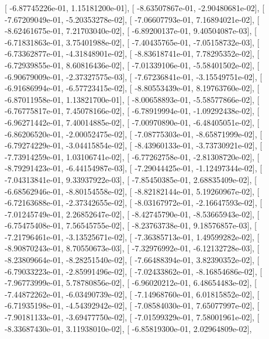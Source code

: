 \documentclass{article}
\begin{document}
       [ -6.87745226e-01,   1.15181200e-01],
       [ -8.63507867e-01,  -2.90480681e-02],
       [ -7.67209049e-01,  -5.20353278e-02],
       [ -7.06607793e-01,   7.16894021e-02],
       [ -8.62461675e-01,   7.21703040e-02],
       [ -6.89200137e-01,   9.40504087e-03],
       [ -6.71831863e-01,   3.75401988e-02],
       [ -7.40435765e-01,  -7.05158732e-03],
       [ -6.73362877e-01,  -4.31848901e-02],
       [ -8.83618741e-01,   7.78295352e-02],
       [ -6.72939855e-01,   8.60816436e-02],
       [ -7.01339106e-01,  -5.58401502e-02],
       [ -6.90679009e-01,  -2.37327575e-03],
       [ -7.67236841e-01,  -3.15549751e-02],
       [ -6.91686994e-01,  -6.57723415e-02],
       [ -8.80553439e-01,   8.19763760e-02],
       [ -6.87011958e-01,   1.13821700e-01],
       [ -8.00658893e-01,  -5.58577866e-02],
       [ -6.76775817e-01,   7.45078166e-02],
       [ -6.78919994e-01,  -1.09292438e-02],
       [ -6.96271442e-01,   7.40014885e-02],
       [ -7.00970890e-01,  -6.48405051e-02],
       [ -6.86206520e-01,  -2.00052475e-02],
       [ -7.08775303e-01,  -8.65871999e-02],
       [ -6.79274229e-01,  -3.04415854e-02],
       [ -8.43960133e-01,  -3.73730921e-02],
       [ -7.73914259e-01,   1.03106741e-02],
       [ -6.77262758e-01,  -2.81308720e-02],
       [ -8.79291423e-01,  -6.44154987e-03],
       [ -7.29044425e-01,  -1.12497344e-02],
       [ -7.04313841e-01,   9.33937922e-03],
       [ -7.85450385e-01,   2.68835409e-02],
       [ -6.68562946e-01,  -8.80154558e-02],
       [ -8.82182144e-01,   5.19260967e-02],
       [ -6.72163688e-01,  -2.37342655e-02],
       [ -8.03167972e-01,  -2.16647593e-02],
       [ -7.01245749e-01,   2.26852647e-02],
       [ -8.42745790e-01,  -8.53665943e-02],
       [ -6.75475408e-01,   7.56545755e-02],
       [ -8.23763738e-01,   9.18576857e-03],
       [ -7.21796461e-01,  -3.13525671e-02],
       [ -7.36385713e-01,   1.49599282e-02],
       [ -8.90870243e-01,   8.70550673e-03],
       [ -7.32976992e-01,  -6.12132728e-03],
       [ -8.23809664e-01,  -8.28251540e-02],
       [ -7.66488394e-01,   3.82390352e-02],
       [ -6.79033223e-01,  -2.85991496e-02],
       [ -7.02433862e-01,  -8.16854686e-02],
       [ -7.96773999e-01,   5.78780856e-02],
       [ -6.96020212e-01,   6.48654483e-02],
       [ -7.44872262e-01,  -6.03490739e-02],
       [ -7.14968760e-01,   6.01815852e-02],
       [ -6.71935198e-01,  -4.54392942e-02],
       [ -7.08584030e-01,   7.65077997e-02],
       [ -7.90181133e-01,  -3.69477750e-02],
       [ -7.01599329e-01,   7.58001961e-02],
       [ -8.33687430e-01,   3.11938010e-02],
       [ -6.85819300e-01,   2.02964809e-02],
\end{document}
